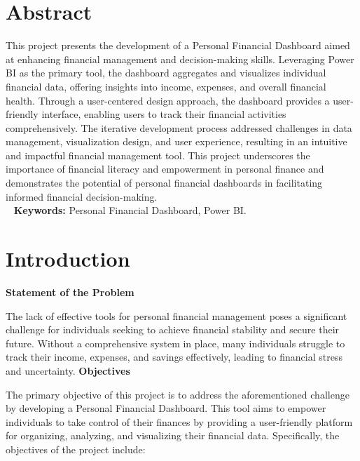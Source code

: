 \documentclass[12pt]{report}
\begin{document}
\begin{titlepage}

\end{titlepage}

{}

\chapter*{Abstract}
This project presents the development of a Personal Financial Dashboard aimed at enhancing financial management and decision-making skills. Leveraging Power BI as the primary tool, the dashboard aggregates and visualizes individual financial data, offering insights into income, expenses, and overall financial health. Through a user-centered design approach, the dashboard provides a user-friendly interface, enabling users to track their financial activities comprehensively. The iterative development process addressed challenges in data management, visualization design, and user experience, resulting in an intuitive and impactful financial management tool. This project underscores the importance of financial literacy and empowerment in personal finance and demonstrates the potential of personal financial dashboards in facilitating informed financial decision-making.
\\\
\vspace{1cm}
\textbf{Keywords: }{Personal Financial Dashboard, Power BI. }

\tableofcontents{}

\listoffigures{}


 





\pagenumbering{arabic}
\chapter*{Introduction}

\textbf{Statement of the Problem}

The lack of effective tools for personal financial management poses a significant challenge for individuals seeking to achieve financial stability and secure their future. Without a comprehensive system in place, many individuals struggle to track their income, expenses, and savings effectively, leading to financial stress and uncertainty.
\textbf{Objectives}

The primary objective of this project is to address the aforementioned challenge by developing a Personal Financial Dashboard. This tool aims to empower individuals to take control of their finances by providing a user-friendly platform for organizing, analyzing, and visualizing their financial data. Specifically, the objectives of the project include:
\end{document}
